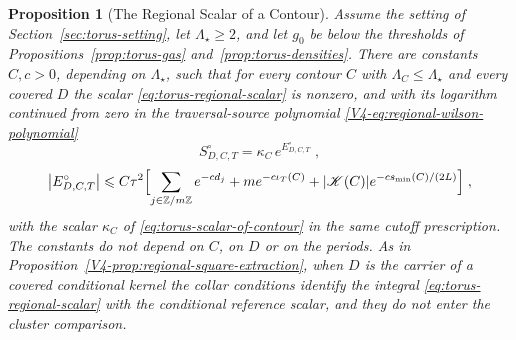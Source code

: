 \documentclass[11pt]{article}
\numberwithin{equation}{section}
\newtheorem{proposition}[theorem]{Proposition}
\theoremstyle{remark}
\theoremstyle{plain}
\begin{document}
\begin{proposition}[The Regional Scalar of a Contour]\label{prop:torus-scalar}
Assume the setting of Section~\ref{sec:torus-setting}, let $\Lambda_{\star}\geqslant 2$, and let $g_0$ be below the thresholds of Propositions~\ref{prop:torus-gas} and~\ref{prop:torus-densities}. There are constants $C,c>0$, depending on $\Lambda_{\star}$, such that for every contour $C$ with $\Lambda_C\leqslant \Lambda_{\star}$ and every covered $D$ the scalar \eqref{eq:torus-regional-scalar} is nonzero, and with its logarithm continued from zero in the traversal-source polynomial \eqref{V4-eq:regional-wilson-polynomial}
\begin{equation}\label{eq:torus-extraction}
    S^{\circ}_{D,C,T}=\kappa_C\,e^{E^{\circ}_{D,C,T}}\;,
\end{equation}
\begin{equation}\label{eq:torus-error}
    \bigl| E^{\circ}_{D,C,T}\bigr|\leqslant C\tau^2\Bigl[\sum_{j\in\mathbb Z/m\mathbb Z}e^{-cd_j}+me^{-c\iota_T(C)}+|\mathscr K(C)|e^{-cs_{\min}(C)/(2L)}\Bigr]\;,
\end{equation}
with the scalar $\kappa_C$ of \eqref{eq:torus-scalar-of-contour} in the same cutoff prescription. The constants do not depend on $C$, on $D$ or on the periods. As in Proposition~\ref{V4-prop:regional-square-extraction}, when $D$ is the carrier of a covered conditional kernel the collar conditions identify the integral \eqref{eq:torus-regional-scalar} with the conditional reference scalar, and they do not enter the cluster comparison.
\end{proposition}
\end{document}
